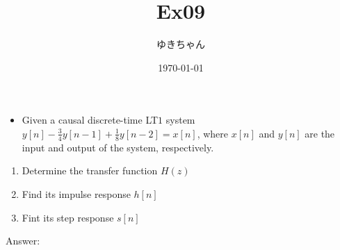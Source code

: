 \documentclass[a4paper,16pt]{jsarticle}
\title{Ex09}
\author{ゆきちゃん}
\date{\today}
\begin{document}
\maketitle

\begin{itemize}
	\item Given a causal discrete-time LT$1$ system $y[n]-\frac{3}{4}y[n-1]+\frac{1}{8}y[n-2] = x[n]$, where $x[n]$ and $y[n]$ are the input and output of the system, respectively.
\end{itemize}
\begin{enumerate}
	\item Determine the transfer function $H(z)$
	\item Find its impulse response $h[n]$
	\item Fint its step response $s[n]$
\end{enumerate}

Answer:
\end{document}
